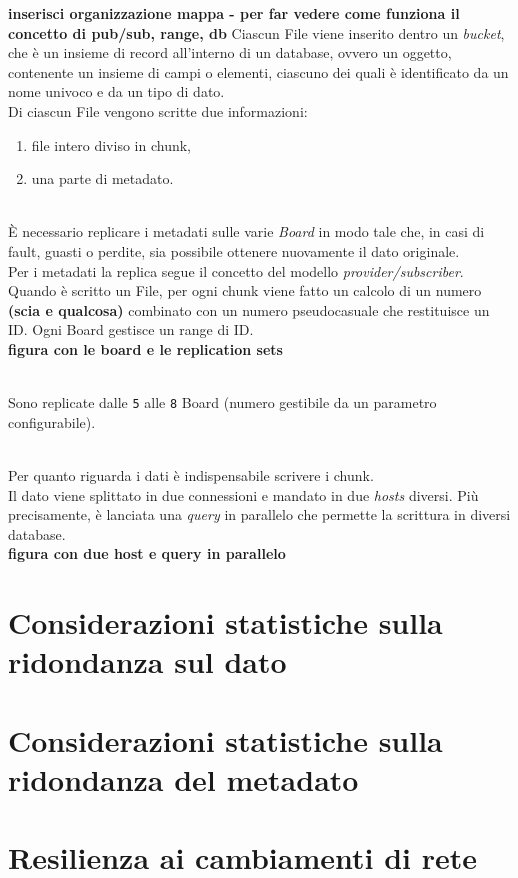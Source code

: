 \textbf{inserisci organizzazione mappa - per far vedere come funziona il concetto di pub/sub, range, db}
Ciascun File viene inserito dentro un \textit{bucket}, che \`{e} un insieme di record all'interno di un database, ovvero un oggetto, contenente un insieme di campi o elementi, ciascuno dei quali \`{e} identificato da un nome univoco e da un tipo di dato.\\

Di ciascun File vengono scritte due informazioni:
\begin{enumerate}
\item 
file intero diviso in chunk,
\item
una parte di metadato.
\end{enumerate}\\

\`{E} necessario replicare i metadati sulle varie \textit{Board} in modo tale che, in casi di fault, guasti o perdite, sia possibile ottenere nuovamente il dato originale.\\

Per i metadati la replica segue il concetto del modello \textit{provider/subscriber}. 
Quando \`{e} scritto un File, per ogni chunk viene fatto un calcolo di un numero \textbf{(scia e qualcosa)} combinato con un numero pseudocasuale che restituisce un ID.
Ogni Board gestisce un range di ID. \\

\textbf{figura con le board e le replication sets}

\\
Sono replicate dalle \verb"5" alle \verb"8" Board (numero gestibile da un parametro configurabile).

\\
Per quanto riguarda i dati \`{e} indispensabile scrivere i chunk.\\ 
Il dato viene splittato in due connessioni e mandato in due \textit{hosts} diversi. Pi\`{u} precisamente, \`{e} lanciata una \textit{query} in parallelo che permette la scrittura in diversi database. \\
\textbf{figura con due host e query in parallelo}

\section{Considerazioni statistiche sulla ridondanza sul dato}
\section{Considerazioni statistiche sulla ridondanza del metadato}
\section{Resilienza ai cambiamenti di rete}